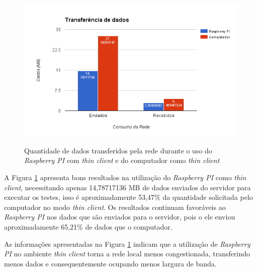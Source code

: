 \documentclass[
	12pt,				%
	openright,			%
	twoside,			%
	a4paper,			%
	chapter=TITLE,		%
	english,			%
	brazil				%
	]{abntex2}
\begin{document}
\begin{figure}[!h]
\centering
\caption{Quantidade de dados transferidos pela rede durante o uso do \textit{Raspberry PI} com \textit{thin client} e do computador como \textit{thin client}}
\includegraphics[scale=0.8]{Imagens/net}
\label{fig:net}
\end{figure}

\newpage
A Figura \ref{fig:net} apresenta bons resultados na utilização do \textit{Raspberry PI} como \textit{thin client}, necessitando apenas 14,78717136 MB de dados enviados  do servidor para executar os testes, isso é aproximadamente 53,47\% da quantidade solicitada pelo computador no modo \textit{thin client}. Os resultados continuam favoráveis ao \textit{Raspberry PI} nos dados que são enviados para o servidor, pois o ele enviou aproximadamente 65,21\% de dados que o computador.

As informações apresentadas na Figura \ref{fig:net} indicam que a utilização de \textit{Raspberry PI} no ambiente \textit{thin client} torna a rede local menos congestionada, transferindo menos dados e consequentemente ocupando menos largura de banda. 



\end{document}
